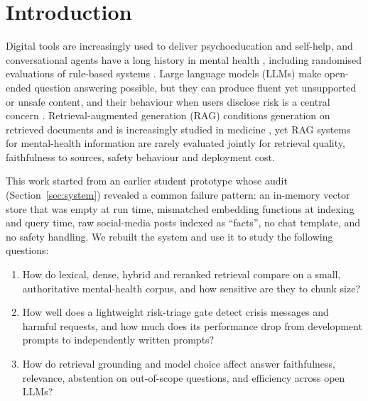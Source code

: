 \documentclass[preprint,12pt,authoryear]{elsarticle}
\begin{document}
\section{Introduction}
Digital tools are increasingly used to deliver psychoeducation and self-help, and conversational agents have a long
history in mental health \citep{vaidyam2019chatbots,abdalrazaq2019overview}, including randomised evaluations of
rule-based systems \citep{fitzpatrick2017woebot}. Large language models (LLMs) make open-ended question answering
possible, but they can produce fluent yet unsupported or unsafe content, and their behaviour when users disclose risk is
a central concern \citep{dechoudhury2023benefits,stade2024behavioral,hua2024llmmh,guo2024llmmhreview}.
Retrieval-augmented generation (RAG) conditions generation on retrieved documents \citep{lewis2020rag,gao2023ragsurvey}
and is increasingly studied in medicine \citep{xiong2024medrag}, yet RAG systems for mental-health information are
rarely evaluated jointly for retrieval quality, faithfulness to sources, safety behaviour and deployment cost.

This work started from an earlier student prototype whose audit (Section~\ref{sec:system}) revealed a common failure
pattern: an in-memory vector store that was empty at run time, mismatched embedding functions at indexing and query time,
raw social-media posts indexed as ``facts'', no chat template, and no safety handling. We rebuilt the system and use it
to study the following questions:
\begin{enumerate}[label=\textbf{RQ\arabic*},leftmargin=*]
\item How do lexical, dense, hybrid and reranked retrieval compare on a small, authoritative mental-health corpus, and
      how sensitive are they to chunk size?
\item How well does a lightweight risk-triage gate detect crisis messages and harmful requests, and how much does its
      performance drop from development prompts to independently written prompts?
\item How do retrieval grounding and model choice affect answer faithfulness, relevance, abstention on out-of-scope
      questions, and efficiency across open LLMs?
\end{enumerate}
\end{document}
